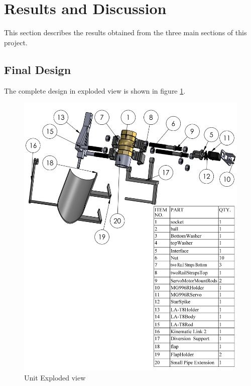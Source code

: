 \section{Results and Discussion}
This section describes the results obtained from the three main sections of this project. 
\subsection{Final Design}
The complete design in exploded view is shown in figure \ref{fig:unit_exploded_view}.
\begin{figure}[H]
    \centering
    \includegraphics[height=.7\textheight]{Figures/DischargeFlowControlAssemblyExploded.PNG}
    \caption{Unit Exploded view}
    \label{fig:unit_exploded_view}
\end{figure}

